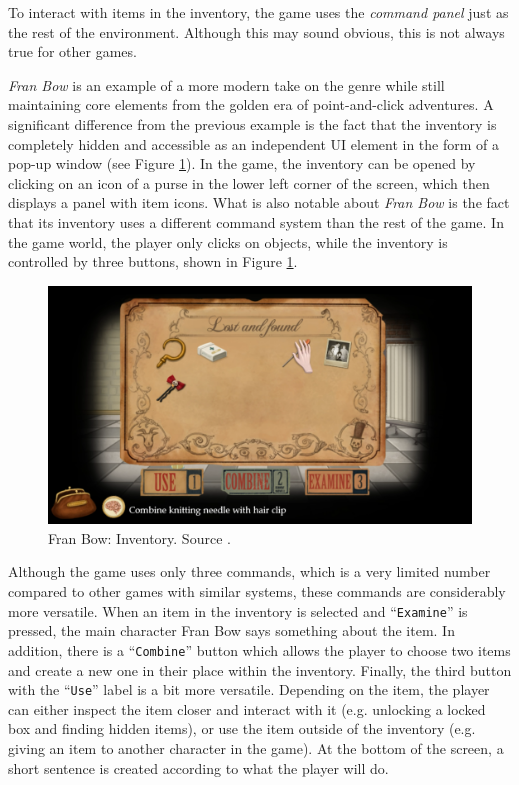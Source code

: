 To interact with items in the inventory, the game uses the \textit{command panel} just as the rest of the environment. Although this may sound obvious, this is not always true for other games. 

\textit{Fran Bow} is an example of a more modern take on the genre while still maintaining core elements from the golden era of point-and-click adventures.  A significant difference from the previous example is the fact that the inventory is completely hidden and accessible as an independent UI element in the form of a pop-up window (see Figure \ref{fig:I-FranBow}). In the game, the inventory can be opened by clicking on an icon of a purse in the lower left corner of the screen, which then displays a panel with item icons. What is also notable about \textit{Fran Bow} is the fact that its inventory uses a different command system than the rest of the game. In the game world, the player only clicks on objects, while the inventory is controlled by three buttons, shown in Figure \ref{fig:I-FranBow}. 

\begin{figure}[H]
\centering
\includegraphics[width=.8\linewidth]{img/Fran_Bow.png}
\caption{Fran Bow: Inventory. Source \cite{FranBow}.}
\label{fig:I-FranBow}
\end{figure}

Although the game uses only three commands, which is a very limited number compared to other games with similar systems, these commands are considerably more versatile. When an item in the inventory is selected and “\texttt{Examine}” is pressed, the main character Fran Bow says something about the item. In addition, there is a “\texttt{Combine}” button which allows the player to choose two items and create a new one in their place within the inventory. Finally, the third button with the “\texttt{Use}” label is a bit more versatile. Depending on the item, the player can either inspect the item closer and interact with it (e.g. unlocking a locked box and finding hidden items), or use the item outside of the inventory (e.g. giving an item to another character in the game). At the bottom of the screen, a short sentence is created according to what the player will do.

